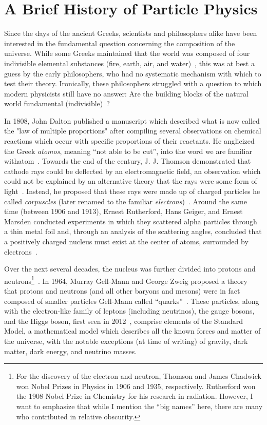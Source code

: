 \section{A Brief History of Particle Physics}\label{sec:a_brief_history_of_particle_physics}

Since the days of the ancient Greeks, scientists and philosophers alike have been interested in the fundamental question concerning the composition of the universe. While some Greeks maintained that the world was composed of four indivisible elemental substances (fire, earth, air, and water)~\cite{Ross1925}, this was at best a guess by the early philosophers, who had no systematic mechanism with which to test their theory. Ironically, these philosophers struggled with a question to which modern physicists still have no answer: Are the building blocks of the natural world fundamental (indivisible)~\cite{Hardie1984}?

In 1808, John Dalton published a manuscript which described what is now called the "law of multiple proportions" after compiling several observations on chemical reactions which occur with specific proportions of their reactants. He anglicized the Greek \textit{atomos}, meaning ``not able to be cut'', into the word we are familiar with\textemdash atom~\cite{Dalton1808}. Towards the end of the century, J. J. Thomson demonstrated that cathode rays could be deflected by an electromagnetic field, an observation which could not be explained by an alternative theory that the rays were some form of light~\cite{Thomson1897}. Instead, he proposed that these rays were made up of charged particles he called \textit{corpuscles} (later renamed to the familiar \textit{electrons})~\cite{Thomson1907}. Around the same time (between 1906 and 1913), Ernest Rutherford, Hans Geiger, and Ernest Marsden conducted experiments in which they scattered alpha particles through a thin metal foil and, through an analysis of the scattering angles, concluded that a positively charged nucleus must exist at the center of atoms, surrounded by electrons~\cite{Rutherford1911}.

Over the next several decades, the nucleus was further divided into protons and neutrons\footnote{For the discovery of the electron and neutron, Thomson and James Chadwick won Nobel Prizes in Physics in 1906 and 1935, respectively. Rutherford won the 1908 Nobel Prize in Chemistry for his research in radiation. However, I want to emphasize that while I mention the ``big names'' here, there are many who contributed in relative obscurity.}~\cite{Masson1921,Chadwick1932}. In 1964, Murray Gell-Mann and George Zweig proposed a theory that protons and neutrons (and all other baryons and mesons) were in fact composed of smaller particles Gell-Mann called ``quarks''~\cite{Gell-Mann1964}. These particles, along with the electron-like family of leptons (including neutrinos), the gauge bosons, and the Higgs boson, first seen in 2012~\cite{Aad2012}, comprise elements of the Standard Model, a mathematical model which describes all the known forces and matter of the universe, with the notable exceptions (at time of writing) of gravity, dark matter, dark energy, and neutrino masses.

